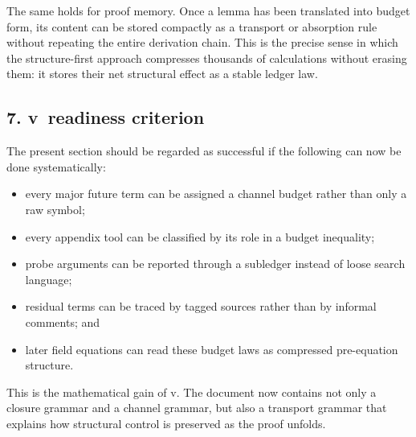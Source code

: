 The same holds for proof memory. Once a lemma has been translated into budget form,
its content can be stored compactly as a transport or absorption rule without
repeating the entire derivation chain. This is the precise sense in which the
structure-first approach compresses thousands of calculations without erasing them:
it stores their net structural effect as a stable ledger law.

\subsection*{7. v\docversion\ readiness criterion}
The present section should be regarded as successful if the following can now be
done systematically:
\begin{itemize}
  \item every major future term can be assigned a channel budget rather than only a raw symbol;
  \item every appendix tool can be classified by its role in a budget inequality;
  \item probe arguments can be reported through a subledger instead of loose search language;
  \item residual terms can be traced by tagged sources rather than by informal comments; and
  \item later field equations can read these budget laws as compressed pre-equation structure.
\end{itemize}


This is the mathematical gain of v\docversion. The document now contains not only a
closure grammar and a channel grammar, but also a transport grammar that explains
how structural control is preserved as the proof unfolds.

